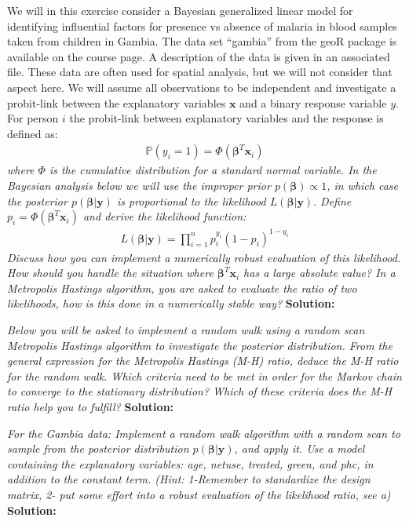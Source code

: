 We will in this exercise consider a Bayesian
generalized linear model for identifying influential factors for presence vs absence of malaria
in blood samples taken from children in Gambia. The data set “gambia” from the geoR package
is available on the course page. A description of the data is given in an associated file. These
data are often used for spatial analysis, but we will not consider that aspect here. We will
assume all observations to be independent and investigate a probit-link between the
explanatory variables $\boldsymbol{x}$ and a binary response variable $y$. For person $i$ the probit-link between
explanatory variables and the response is defined as:
\begin{align}
    \mathbb{P}(y_i = 1) = \Phi(\boldsymbol{\beta}^T \boldsymbol{x}_i)
\end{align}
\emph{where $\Phi$ is the cumulative distribution for a standard normal variable. In the Bayesian analysis below we will use the improper prior $p(\boldsymbol{\beta}) \propto 1$, in which case the posterior $p(\boldsymbol{\beta} | \boldsymbol{y})$ is
proportional to the likelihood $L(\boldsymbol{\beta} | \boldsymbol{y})$.}
\emph{Define $p_i = \Phi(\boldsymbol{\beta}^T \boldsymbol{x}_i)$ and derive the likelihood function:} 
\begin{align}
    L \left(\boldsymbol{\beta}| \boldsymbol{y} \right) = \prod_{i=1}^{n} p_{i}^{y_i}(1 - p_i)^{1 - y_i} \label{eq:likelihood_exercise_3}
\end{align}
\emph{Discuss how you can implement a numerically robust evaluation of this likelihood.
How should you handle the situation where $\boldsymbol{\beta}^T \boldsymbol{x}_i$ has a large absolute value? In a Metropolis Hastings algorithm, you are asked to evaluate the ratio of two likelihoods, how is this done in a numerically stable way?}\spaze
\textbf{Solution:} \spaze

\emph{Below you will be asked to implement a random walk using a random scan Metropolis
Hastings algorithm to investigate the posterior distribution. From the general
expression for the Metropolis Hastings (M-H) ratio, deduce the M-H ratio for the
random walk. Which criteria need to be met in order for the Markov chain to converge
to the stationary distribution? Which of these criteria does the M-H ratio help you to
fulfill?}  \spaze
\textbf{Solution:} \spaze

\emph{For the Gambia data: Implement a random walk algorithm with a random scan to
sample from the posterior distribution $p(\boldsymbol{\beta} | \boldsymbol{y})$, and apply it. Use a model containing the explanatory variables: age, netuse, treated, green, and phc, in addition to the constant term. (Hint: 1-Remember to standardize the design matrix, 2- put some effort
into a robust evaluation of the likelihood ratio, see a)}  \spaze
\textbf{Solution:} \spaze

